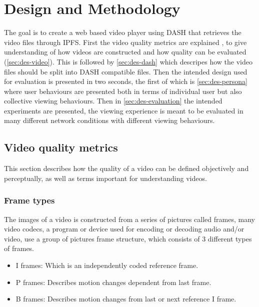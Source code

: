 \chapter{Design and Methodology}
\label{cha:design-and-method}

The goal is to create a web based video player using \ac{DASH} that retrieves the video files through \ac{IPFS}. First the video quality metrics are explained , to give understanding of how videos are constructed and how quality can be evaluated (\autoref{sec:des-video}). This is followed by \autoref{sec:des-dash} which descripes how the video files should be split into \ac{DASH} compatible files. Then the intended design used for evaluation is presented in two seconds, the first of which is \autoref{sec:des-persona} where user behaviours are presented both in terms of individual user but also collective viewing behaviours. Then in \autoref{sec:des-evaluation} the intended experiments are presented, the viewing experience is meant to be evaluated in many different network conditions with different viewing behaviours.

\section{Video quality metrics}
\label{sec:des-video}
This section describes how the quality of a video can be defined objectively and perceptually, as well as terms important for understanding videos.

\subsection{Frame types}
The images of a video is constructed from a series of pictures called frames, many video codecs, a program or device used for encoding or decoding audio and/or video, use a group of pictures frame structure, which consists of 3 different types of frames.

\begin{itemize}
    \item I frames: Which is an independently coded reference frame.
    \item P frames: Describes motion changes dependent from last frame.
    \item B frames: Describes motion changes from last or next reference I frame.
\end{itemize}

